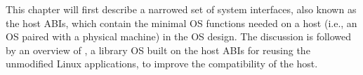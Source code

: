 This chapter will first describe a narrowed set of system interfaces, also known as the host ABIs,
which contain the minimal OS functions
needed on a host (i.e., an OS paired with a physical machine) in the OS design.
The discussion is followed by an overview of \graphene{},
a library OS built on the host ABIs for reusing the unmodified Linux applications, to improve the compatibility of the host.